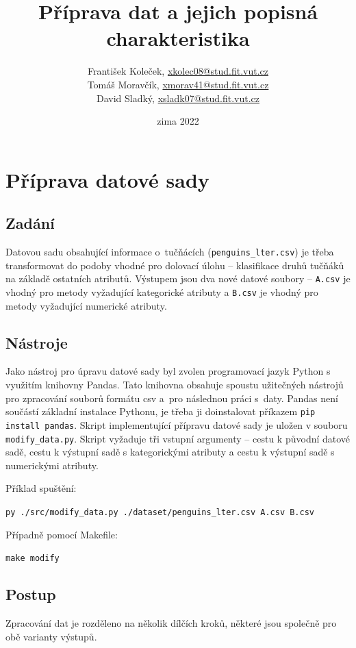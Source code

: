 \documentclass[10pt,xcolor=pdflatex,dvipsnames,table,oneside]{book}
\author{
    František Koleček, \href{mailto:xkolec08@stud.fit.vut.cz}{xkolec08@stud.fit.vut.cz} \\
    Tomáš Moravčík, \href{mailto:xmorav41@stud.fit.vut.cz}{xmorav41@stud.fit.vut.cz} \\
    David Sladký, \href{mailto:xsladk07@stud.fit.vut.cz}{xsladk07@stud.fit.vut.cz}
    }
\title{Příprava dat a jejich popisná charakteristika}
\date{zima 2022}
\begin{document}

\hypersetup{pageanchor=false}%
\maketitle
\hypersetup{pageanchor=true}

\tableofcontents

\newpage%

\chapter{Příprava datové sady}

\section{Zadání}
Datovou sadu obsahující informace o~tučňácích (\verb|penguins_lter.csv|) je třeba transformovat do podoby vhodné pro dolovací úlohu – klasifikace druhů tučňáků na základě ostatních atributů. Výstupem jsou dva nové datové soubory – \verb|A.csv| je vhodný pro metody vyžadující kategorické atributy a \verb|B.csv| je vhodný pro metody vyžadující numerické atributy.
\section{Nástroje}
Jako nástroj pro úpravu datové sady byl zvolen programovací jazyk Python s využitím knihovny Pandas. Tato knihovna obsahuje spoustu užitečných nástrojů pro zpracování souborů formátu csv a~pro následnou práci s~daty. Pandas není součástí základní instalace Pythonu, je třeba ji doinstalovat příkazem \verb|pip install pandas|. Skript implementující přípravu datové sady je uložen v souboru \verb|modify_data.py|. Skript vyžaduje tři vstupní argumenty – cestu k původní datové sadě, cestu k výstupní sadě s kategorickými atributy a cestu k výstupní sadě s numerickými atributy.\

Příklad spuštění:\

\verb|py ./src/modify_data.py ./dataset/penguins_lter.csv A.csv B.csv|\

Případně pomocí Makefile:\

\verb|make modify|\
\section{Postup}
Zpracování dat je rozděleno na několik dílčích kroků, některé jsou společně pro obě varianty výstupů.
\end{document}
